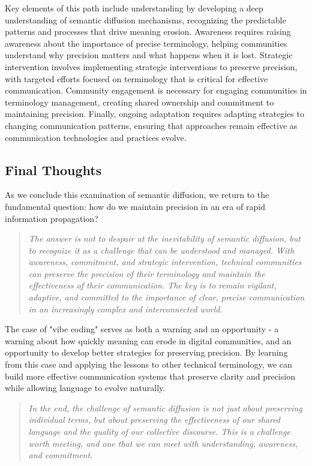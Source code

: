 \documentclass[11pt]{article}
\begin{document}
Key elements of this path include understanding by developing a deep understanding of semantic diffusion mechanisms, recognizing the predictable patterns and processes that drive meaning erosion. Awareness requires raising awareness about the importance of precise terminology, helping communities understand why precision matters and what happens when it is lost. Strategic intervention involves implementing strategic interventions to preserve precision, with targeted efforts focused on terminology that is critical for effective communication. Community engagement is necessary for engaging communities in terminology management, creating shared ownership and commitment to maintaining precision. Finally, ongoing adaptation requires adapting strategies to changing communication patterns, ensuring that approaches remain effective as communication technologies and practices evolve.

\subsection{Final Thoughts}

As we conclude this examination of semantic diffusion, we return to the fundamental question: how do we maintain precision in an era of rapid information propagation?

\begin{quote}
\emph{The answer is not to despair at the inevitability of semantic diffusion, but to recognize it as a challenge that can be understood and managed. With awareness, commitment, and strategic intervention, technical communities can preserve the precision of their terminology and maintain the effectiveness of their communication. The key is to remain vigilant, adaptive, and committed to the importance of clear, precise communication in an increasingly complex and interconnected world.}
\end{quote}

The case of "vibe coding" serves as both a warning and an opportunity - a warning about how quickly meaning can erode in digital communities, and an opportunity to develop better strategies for preserving precision. By learning from this case and applying the lessons to other technical terminology, we can build more effective communication systems that preserve clarity and precision while allowing language to evolve naturally.

\begin{quote}
\emph{In the end, the challenge of semantic diffusion is not just about preserving individual terms, but about preserving the effectiveness of our shared language and the quality of our collective discourse. This is a challenge worth meeting, and one that we can meet with understanding, awareness, and commitment.}
\end{quote}
\end{document}
